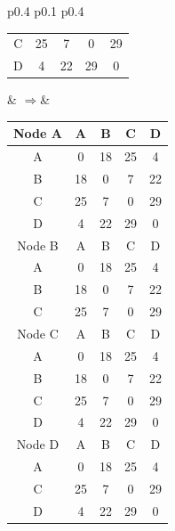 \documentclass{article}
\begin{document}
\begin{tabular}{p{0.4\linewidth} p{0.1\linewidth} p{0.4\linewidth}}
\begin{tabular}{c|c|c|c|c}
        C & 25 & 7 & 0 & \color{red}29 \\
        D & 4 & 22 & \color{red}29 & 0 \\
        \hline
    \end{tabular}
    &  $\Rightarrow$&
    \begin{tabular}{c|c|c|c|c}
        \hline
        Node A & A & B & C & D \\
        \hline
        A & 0 & 18 & 25 & 4 \\
        B & 18 & 0 & 7 & 22 \\
        C & 25 & 7 & 0 & 29 \\
        D & 4 & 22 & 29 & 0 \\
        \hline
        \hline
        Node B & A & B & C & D \\
        \hline 
        A & 0 & 18 & 25 & 4 \\
        B & 18 & 0 & 7 & 22 \\
        C & 25 & 7 & 0 & 29 \\
        \hline
        \hline
        Node C & A & B & C & D \\
        \hline
        A & 0 & 18 & 25 & 4 \\
        B & 18 & 0 & 7 & 22 \\
        C & 25 & 7 & 0 & 29 \\
        D & 4 & 22 & 29 & 0 \\
        \hline
        \hline
        Node D & A & B & C & D \\
        \hline
        A & 0 & 18 & 25 & 4 \\
        C & 25 & 7 & 0 & 29 \\
        D & 4 & 22 & 29 & 0 \\
        \hline
    \end{tabular}
\end{tabular}
\end{document}
